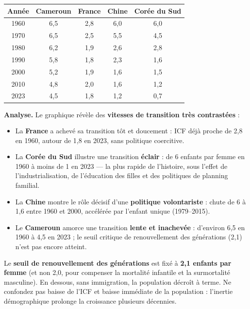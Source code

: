 \documentclass[11pt]{article}
\begin{document}
\begin{center}
\begin{tabular}{|c|cccc|}\hline
\rowcolor{popblueL}
\textbf{Année} & \textbf{Cameroun} & \textbf{France} & \textbf{Chine} & \textbf{Corée du Sud} \\ \hline
1960 & 6,5 & 2,8 & 6,0 & 6,0 \\
1970 & 6,5 & 2,5 & 5,5 & 4,5 \\
1980 & 6,2 & 1,9 & 2,6 & 2,8 \\
1990 & 5,8 & 1,8 & 2,3 & 1,6 \\
2000 & 5,2 & 1,9 & 1,6 & 1,5 \\
2010 & 4,8 & 2,0 & 1,6 & 1,2 \\
2023 & 4,5 & 1,8 & 1,2 & 0,7 \\ \hline
\end{tabular}
\end{center}

\textbf{Analyse.} Le graphique révèle des \textbf{vitesses de transition très contrastées} :
\begin{itemize}
\item La \textbf{France} a achevé sa transition tôt et doucement : ICF déjà proche de 2,8 en 1960, autour de 1,8 en 2023, sans politique coercitive.
\item La \textbf{Corée du Sud} illustre une transition \textbf{éclair} : de 6 enfants par femme en 1960 à moins de 1 en 2023 — la plus rapide de l'histoire, sous l'effet de l'industrialisation, de l'éducation des filles et des politiques de planning familial.
\item La \textbf{Chine} montre le rôle décisif d'une \textbf{politique volontariste} : chute de 6 à 1,6 entre 1960 et 2000, accélérée par l'enfant unique (1979--2015).
\item Le \textbf{Cameroun} amorce une transition \textbf{lente et inachevée} : d'environ 6,5 en 1960 à 4,5 en 2023 ; le seuil critique de renouvellement des générations (2,1) n'est pas encore atteint.
\end{itemize}

\begin{attention}
Le \textbf{seuil de renouvellement des générations} est fixé à \textbf{2,1 enfants par femme} (et non 2,0, pour compenser la mortalité infantile et la surmortalité masculine). En dessous, sans immigration, la population décroît à terme. Ne confondez pas baisse de l'ICF et baisse immédiate de la population : l'inertie démographique prolonge la croissance plusieurs décennies.
\end{attention}
\end{document}
